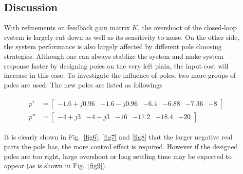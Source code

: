 \documentclass[hyperref]{article}
\theoremstyle{nonumberplain}
\begin{document}
	\subsection{Discussion}
	
	\hspace{1.0em}
	With refinements on feedback gain matrix $K$, the overshoot of the closed-loop system is largely cut down as well as its sensitivity to noise. On the other side, the system performance is also largely affected by different pole choosing strategies. Although one can always stablize the system and make system response faster by designing poles on the very left plain, the input cost will increase in this case. To investigate the influence of poles, two more groups of poles are used. The new poles are listed as followings
	
	\begin{equation}
	\begin{split}
	\begin{aligned}
	{p}'&= \begin{bmatrix}
	-1.6+j0.96 &-1.6-j0.96  &-6.4  &-6.88  &-7.36  &-8
	\end{bmatrix}\\
	{p}''&= \begin{bmatrix}
	-4+j3 &-4-j3  &-16  &-17.2  &-18.4  &-20 
	\end{bmatrix}
	\end{aligned}
	\end{split}
	\nonumber
	\end{equation}
	
	It is clearly shown in Fig.~\ref{fig6}, \ref{fig7} and \ref{fig8} that the larger negative real parts the pole has, the more control effect is required. However if the designed poles are too right, large overshoot or long settling time may be expected to appear (as is shown in Fig.~\ref{fig9}).
	
\end{document}
